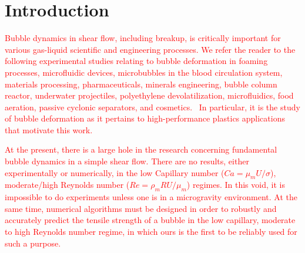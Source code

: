 \documentclass{elsarticle}
\begin{document}

\linenumbers
\section{Introduction}

%
%
\textcolor{red} {
Bubble dynamics in shear flow, including breakup, is critically important for various gas-liquid scientific and engineering processes.  We refer the reader to the following experimental studies relating to bubble deformation in foaming processes, microfluidic devices, microbubbles in the blood circulation system, materials processing, pharmaceuticals, minerals engineering, bubble column reactor, underwater projectiles, polyethylene devolatilization, microfluidics, food aeration, passive cyclonic separators, and cosmetics\cite{ChuFinBouAtaHamPug19,MulTobDreFisWin08,BenRodFauPinFerPerGarMirLim18,DreSai15,EFTEKHARI2021837,WANG2023108105,doi:10.1021/acs.langmuir.1c01814,yoshikawa2010bubble,CanedoETAL,GAO2022103212,WONG2012417,PolyethyleneDevo,FRENSE2024120579,lohse2018bubble,schluter2021small,SANOGO2023112478,hoyt2013performance,sines2020study}.  In particular, it is the study of bubble deformation as it pertains to high-performance plastics applications that motivate this work.
}
\par
\textcolor{red} {
	At the present, there is a large hole in the research concerning fundamental bubble dynamics in a simple shear flow.  There are no results, either experimentally or numerically, in the low Capillary number ($Ca=\mu_{m}U/\sigma$), moderate/high Reynolds number ($Re=\rho_{m} R U/\mu_{m}$) regimes.  In this void, it is impossible to do experiments unless one is in a microgravity environment.  At the same time, numerical algorithms must be designed in order to robustly and accurately predict the tensile strength of a bubble in the low capillary, moderate to high Reynolds number regime, in which ours is the first to be reliably used for such a purpose. 
}
\par
\end{document}
